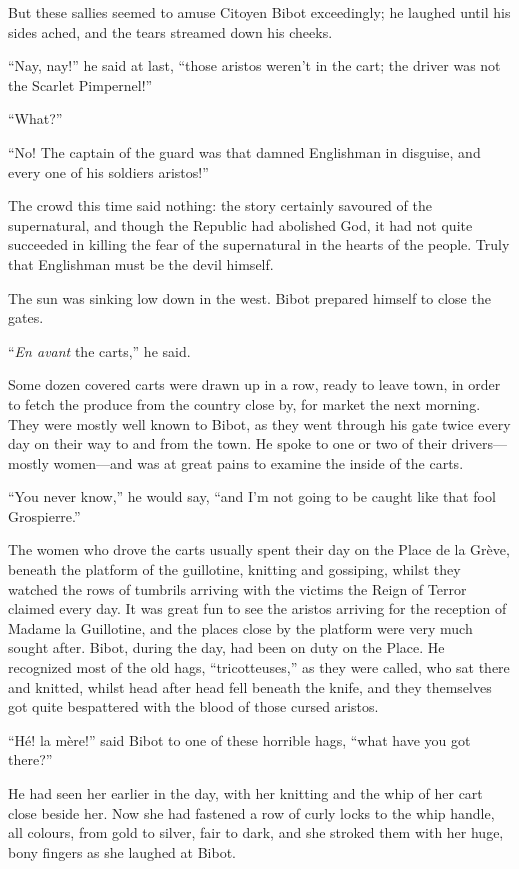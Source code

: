 \documentclass[paper=5.5in:8.5in,BCOR=7mm,twoside,DIV=calc,12pt,usegeometry,chapterprefix,endperiod,headings=big]{scrbook}
\begin{document}
But these sallies seemed to amuse Citoyen Bibot exceedingly; he laughed until his sides ached, and the tears streamed down his cheeks.

\enquote{Nay, nay!} he said at last, \enquote{those aristos weren't in the cart; the driver was not the Scarlet Pimpernel!}

\enquote{What?}

\enquote{No! The captain of the guard was that damned Englishman in disguise, and every one of his soldiers aristos!}

The crowd this time said nothing: the story certainly savoured of the supernatural, and though the Republic had abolished God, it had not quite succeeded in killing the fear of the supernatural in the hearts of the people. Truly that Englishman must be the devil himself.

The sun was sinking low down in the west. Bibot prepared himself to close the gates.

\enquote{\textit{En avant} the carts,} he said.

Some dozen covered carts were drawn up in a row, ready to leave town, in order to fetch the produce from the country close by, for market the next morning. They were mostly well known to Bibot, as they went through his gate twice every day on their way to and from the town. He spoke to one or two of their drivers---mostly women---and was at great pains to examine the inside of the carts.

\enquote{You never know,} he would say, \enquote{and I'm not going to be caught like that fool Grospierre.}

The women who drove the carts usually spent their day on the Place de la Grève, beneath the platform of the guillotine, knitting and gossiping, whilst they watched the rows of tumbrils arriving with the victims the Reign of Terror claimed every day. It was great fun to see the aristos arriving for the reception of Madame la Guillotine, and the places close by the platform were very much sought after. Bibot, during the day, had been on duty on the Place. He recognized most of the old hags, \enquote{tricotteuses,} as they were called, who sat there and knitted, whilst head after head fell beneath the knife, and they themselves got quite bespattered with the blood of those cursed aristos.

\enquote{Hé! la mère!} said Bibot to one of these horrible hags, \enquote{what have you got there?}

He had seen her earlier in the day, with her knitting and the whip of her cart close beside her. Now she had fastened a row of curly locks to the whip handle, all colours, from gold to silver, fair to dark, and she stroked them with her huge, bony fingers as she laughed at Bibot.
\end{document}

